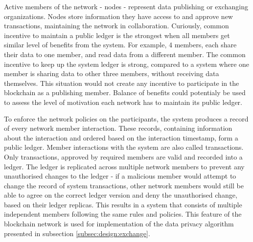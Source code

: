\documentclass[12pt]{article}
\begin{document}
    Active members of the network - nodes - represent data publishing or exchanging organizations. Nodes store information  they have access to and approve new transactions, maintaining the network in collaboration. Curiously, common incentive to maintain a public ledger is the strongest when all members get similar level of benefits from the system. For example, 4 members, each share their data to one member, and read data from a different member. The common incentive to keep up the system ledger is strong, compared to a system where one member is sharing data to other three members, without receiving data themselves. This situation would not create any incentive to participate in the blockchain as a publishing member. Balance of benefits could potentialy be used to assess the level of motivation each network has to maintain its public ledger.
    
    To enforce the network policies on the participants, the system produces a record of every network member interaction. These records, containing information about the interaction and ordered based on the interaction timestamp, form a public ledger. Member interactions with the system are also called transactions. Only transactions, approved by required members are valid and recorded into a ledger. The ledger is replicated across multiple network members to prevent any unauthorised changes to the ledger - if a malicious member would attempt to change the record of system transactions, other network members would still be able to agree on the correct ledger version and deny the unauthorised change, based on their ledger replicas. This results in a system that consists of multiple independent members following the same rules and policies. This feature of the blockchain network is used for implementation of the data privacy algorithm presented in subsection \ref{subsec:design:exchange}.
    
\end{document}
